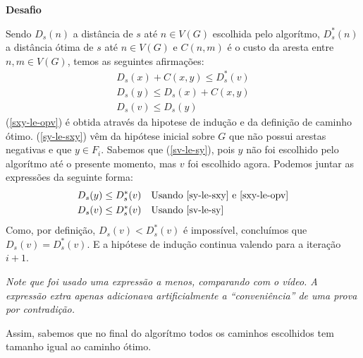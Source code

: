 \documentclass{article}
\newcounter{exe-list}
\newenvironment{exe}[2][Problema]
    {\newcommand{\opt}{(Opcional)}%
    \newcommand{\sketch}[1]{{\bfseries Rascunho:} ##1}%
    \medskip\par\noindent\ifthenelse{\equal{#1}{}}
        {\textbf{\large #2}}
        {\textbf{\large #1~#2}}%
    \medskip\par\noindent}
    {\medskip}
\begin{document}
\begin{exe}[Desafio]{}
\begin{itemize}
            Sendo \(D_s(n)\) a distância de \(s\) até \(n \in V(G)\)
            escolhida pelo algorítmo,
            \(D^*_s(n)\) a distância ótima de \(s\) até \(n \in V(G)\)
            e \(C(n, m)\) é o custo da aresta entre \(n, m \in V(G)\),
            temos as seguintes afirmações:
            \begin{align}
                \label{sxy-le-opv}
                D_s(x) + C(x, y) \le D^*_s(v) \\
                \label{sy-le-sxy}
                D_s(y) \le D_s(x) +  C(x, y) \\
                \label{sv-le-sy}
                D_s(v) \le D_s(y)
            \end{align}
            (\ref{sxy-le-opv})
            é obtida através da hipotese de indução e
            da definição de caminho ótimo.
            (\ref{sy-le-sxy}) vêm da hipótese inicial sobre \(G\)
            que não possui arestas negativas e que \(y \in F_i\).
            Sabemos que (\ref{sv-le-sy}), pois \(y\) não foi escolhido
            pelo algorítmo até o presente momento,
            mas \(v\) foi escolhido agora.
            Podemos juntar as expressões da seguinte forma:
            \begin{align*}
                D_s(y) &\le D^*_s(v)
                    &&\text{Usando \ref{sy-le-sxy} e \ref{sxy-le-opv}}\\
                D_s(v) &\le D^*_s(v)
                    &&\text{Usando \ref{sv-le-sy}}\\
            \end{align*}
            Como, por definição, \(D_s(v) < D^*_s(v)\) é impossível,
            concluímos que \(D_s(v) = D^*_s(v)\).
            E a hipótese de indução continua valendo para
            a iteração \(i+1\).

            \emph{Note que foi usado uma expressão a menos,
            comparando com o vídeo.
            A expressão extra apenas adicionava artificialmente
            a ``conveniência'' de uma prova por contradição.}
    \end{itemize}
    Assim, sabemos que no final do algorítmo
    todos os caminhos escolhidos tem tamanho igual
    ao caminho ótimo.
\end{exe}
\end{document}
